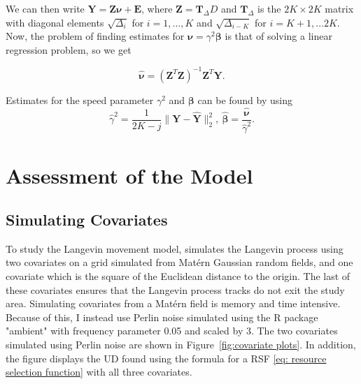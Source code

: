 We can then write $\mathbf{Y} = \mathbf{Z} \bm{\nu} + \mathbf{E}$, where $\mathbf{Z} = \mathbf{T}_\Delta D$ and $\mathbf{T}_\Delta$ is the $2K\times 2K$ matrix with diagonal elements $\sqrt{\Delta_i}$ for $i=1, \dots, K$ and $\sqrt{\Delta_{i-K}}$ for $i=K+1,\dots 2K$. Now, the problem of finding estimates for $\bm{\nu} = \gamma^2 \bm{\beta}$ is that of solving a linear regression problem, so we get

$$
\bm{\hat{\nu}} = (\mathbf{Z}^T\mathbf{Z})^{-1}\mathbf{Z}^T \mathbf{Y}.
$$

Estimates for the speed parameter $\gamma^2$ and $\bm{\beta}$ can be found by using
$$
\hat{\gamma}^2 = \frac{1}{2K-j} \lVert \mathbf{Y} - \mathbf{\hat{Y}} \rVert^2_2, \ 
\bm{\hat{\beta}} = \frac{\bm{\hat{\nu}}}{\hat{\gamma}^2}.
\label{eq: michelot estimates}
$$



\section{Assessment of the Model}

\subsection{Simulating Covariates}
To study the Langevin movement model, \textcite{michelot_langevin_2019} simulates the Langevin process using two covariates on a grid simulated from  Matérn Gaussian random fields, and one covariate which is the square of the Euclidean distance to the origin. The last of these covariates ensures that the Langevin process tracks do not exit the study area. Simulating covariates from a Matérn field is memory and time intensive. Because of this, I instead use Perlin noise simulated using the R package "ambient" with frequency parameter 0.05 and scaled by 3. The two covariates simulated using Perlin noise are shown in Figure~\ref{fig:covariate plots}. In addition, the figure displays the UD found using the formula for a RSF \eqref{eq: resource selection function} with all three covariates.

